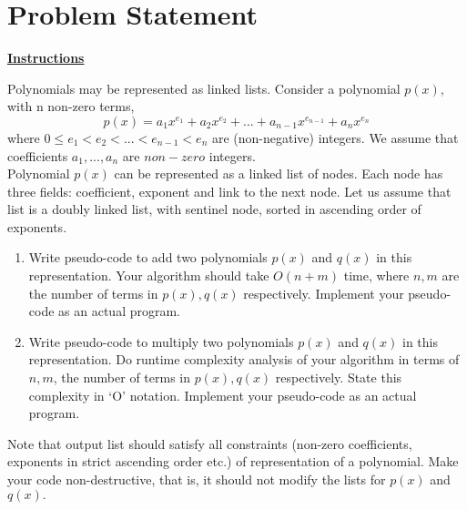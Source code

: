 

\section{Problem Statement}\label{Problem}

\centering \textbf{\underline{Instructions}}

\justifying
Polynomials may be represented as linked lists. Consider a polynomial $p(x)$, with n non-zero terms,
$$p(x) = a_1x^{e_1} +  a_2x^{e_2}  + . . . +  a_{n-1}x^{e_{n-1}}  +  a_n x^{e_n} $$
where $0 \leq e_1 < e_2 < . . . < e_{n-1} < e_n$ are (non-negative) integers. We assume that coefficients $a_1, . . . , a_n$ are $non-zero$ integers. \vspace{5pt} \\
Polynomial $p(x)$ can be represented as a linked list of nodes. Each node has three fields: coefficient, exponent and link to the next node. Let us assume that list is a doubly linked list, with sentinel node, sorted in ascending order of exponents.

\begin{enumerate}[label=(\alph*)]
\item Write pseudo-code to add two polynomials $p(x)$ and $q(x)$ in this representation. Your algorithm should take $O(n + m)$ time, where $n, m$ are the number of terms in $p(x), q(x)$ respectively. Implement your pseudo-code as an actual program.
\item Write pseudo-code to multiply two polynomials $p(x)$ and $q(x)$ in this
representation. Do runtime complexity analysis of your algorithm in terms of $n, m$, the
number of terms in $p(x), q(x)$ respectively. State this complexity in ‘O’ notation.
Implement your pseudo-code as an actual program.
\end{enumerate}
Note that output list should satisfy all constraints (non-zero coefficients, exponents in strict
ascending order etc.) of representation of a polynomial. Make your code non-destructive, that
is, it should not modify the lists for $p(x)$ and $q(x).$ 